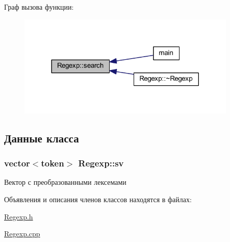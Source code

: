 Граф вызова функции\+:
\nopagebreak
\begin{figure}[H]
\begin{center}
\leavevmode
\includegraphics[width=296pt]{class_regexp_af7c296f94f7577ce0fa662c78268659e_icgraph}
\end{center}
\end{figure}




\subsection{Данные класса}
\subsubsection[{\texorpdfstring{sv}{sv}}]{\setlength{\rightskip}{0pt plus 5cm}vector$<${\bf token}$>$ Regexp\+::sv\hspace{0.3cm}{\ttfamily [private]}}\hypertarget{class_regexp_a784da1e5f4f040a16734c9e3dee089a5}{}\label{class_regexp_a784da1e5f4f040a16734c9e3dee089a5}


Вектор с преобразованными лексемами 



Объявления и описания членов классов находятся в файлах\+:\begin{DoxyCompactItemize}
\item 
\hyperlink{_regexp_8h}{Regexp.\+h}\item 
\hyperlink{_regexp_8cpp}{Regexp.\+cpp}\end{DoxyCompactItemize}

